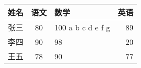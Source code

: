 \documentclass[a4paper, oneside]{ctexart}
\begin{document}
	\begin{tabular}{|l|c|p{1.5cm}|r|}	%
		\hline	%
		姓名 & 语文 & 数学 & 英语 \\
		\hline
		张三 & 80 & 100 a b c d e f g & 89 \\
		\hline
		李四 & 90 & 98 & 20 \\
		\hline
		王五 & 78 & 90 & 77 \\
		\hline
	\end{tabular} %
\end{document}
